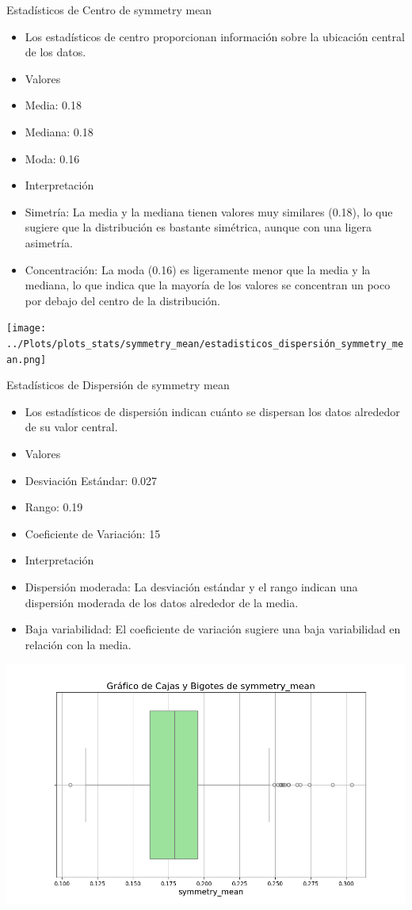 \documentclass[a4paper, 12pt]{article}
\begin{document}
Estadísticos de Centro de symmetry mean
\begin{itemize}
\item Los estadísticos de centro proporcionan información sobre la ubicación central de los datos.

\item Valores

\item Media: 0.18
\item Mediana: 0.18
\item Moda: 0.16
\item Interpretación

\item Simetría: La media y la mediana tienen valores muy similares (0.18), lo que sugiere que la distribución es bastante simétrica, aunque con una ligera asimetría.
\item Concentración: La moda (0.16) es ligeramente menor que la media y la mediana, lo que indica que la mayoría de los valores se concentran un poco por debajo del centro de la distribución.
\end{itemize}


\texttt{[image: ../Plots/plots\_stats/symmetry\_mean/estadisticos\_dispersión\_symmetry\_mean.png]}

Estadísticos de Dispersión de symmetry mean
\begin{itemize}
\item Los estadísticos de dispersión indican cuánto se dispersan los datos alrededor de su valor central.

\item Valores

\item Desviación Estándar: 0.027
\item Rango: 0.19
\item Coeficiente de Variación: 15%
\item Interpretación

\item Dispersión moderada: La desviación estándar y el rango indican una dispersión moderada de los datos alrededor de la media.
\item Baja variabilidad: El coeficiente de variación sugiere una baja variabilidad en relación con la media.
\end{itemize}


\includegraphics[width=\textwidth]{../Plots/plots_stats/symmetry_mean/boxplot_symmetry_mean.png}
\end{document}
